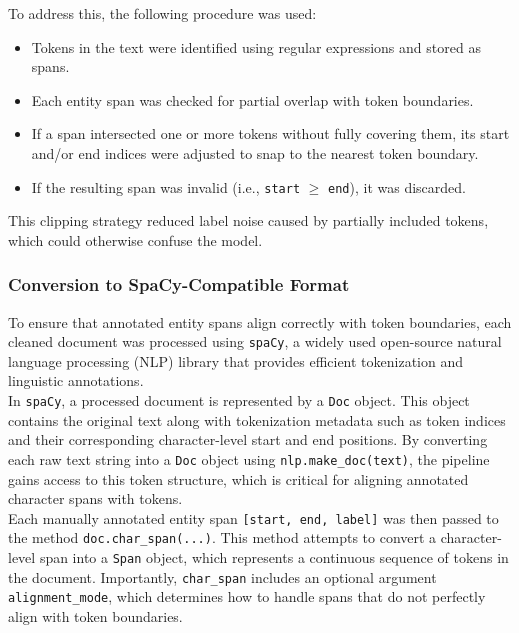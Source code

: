 \documentclass{article}
\begin{document}
To address this, the following procedure was used:
\begin{itemize}
    \item Tokens in the text were identified using regular expressions and stored as spans.
    \item Each entity span was checked for partial overlap with token boundaries.
    \item If a span intersected one or more tokens without fully covering them, its start and/or end indices were adjusted to snap to the nearest token boundary.
    \item If the resulting span was invalid (i.e., \texttt{start} $\geq$ \texttt{end}), it was discarded.
\end{itemize}

This clipping strategy reduced label noise caused by partially included tokens, which could otherwise confuse the model.

\subsubsection{Conversion to SpaCy-Compatible Format}

To ensure that annotated entity spans align correctly with token boundaries, each cleaned document was processed using \texttt{spaCy}, a widely used open-source natural language processing (NLP) library that provides efficient tokenization and linguistic annotations. \\

In \texttt{spaCy}, a processed document is represented by a \texttt{Doc} object. This object contains the original text along with tokenization metadata such as token indices and their corresponding character-level start and end positions. By converting each raw text string into a \texttt{Doc} object using \texttt{nlp.make\_doc(text)}, the pipeline gains access to this token structure, which is critical for aligning annotated character spans with tokens. \\

Each manually annotated entity span \texttt{[start, end, label]} was then passed to the method \texttt{doc.char\_span(...)}. This method attempts to convert a character-level span into a \texttt{Span} object, which represents a continuous sequence of tokens in the document. Importantly, \texttt{char\_span} includes an optional argument \texttt{alignment\_mode}, which determines how to handle spans that do not perfectly align with token boundaries. \\
\end{document}
